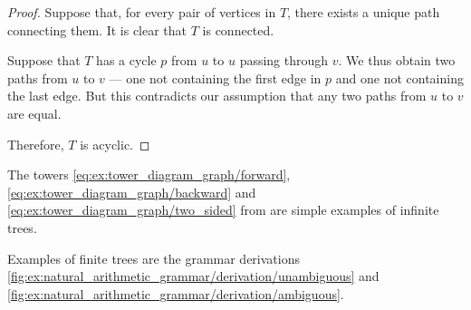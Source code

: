 \begin{proof}
   Suppose that, for every pair of vertices in \( T \), there exists a unique path connecting them. It is clear that \( T \) is connected.

  Suppose that \( T \) has a cycle \( p \) from \( u \) to \( u \) passing through \( v \). We thus obtain two paths from \( u \) to \( v \) --- one not containing the first edge in \( p \) and one not containing the last edge. But this contradicts our assumption that any two paths from \( u \) to \( v \) are equal.

  Therefore, \( T \) is acyclic.
\end{proof}

\begin{example}\label{ex:def:tree}
  The towers \eqref{eq:ex:tower_diagram_graph/forward}, \eqref{eq:ex:tower_diagram_graph/backward} and \eqref{eq:ex:tower_diagram_graph/two_sided} from  are simple examples of infinite trees.

  Examples of finite trees are the grammar derivations \cref{fig:ex:natural_arithmetic_grammar/derivation/unambiguous} and \cref{fig:ex:natural_arithmetic_grammar/derivation/ambiguous}.
\end{example}

